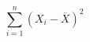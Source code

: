 \documentclass{article}
\begin{document}
\color{fgC}



\pagecolor{bgC}

\begin{displaymath}
\sum_{i=1}^{n} (X_i - \overline{X} )^2
\end{displaymath}
\end{document}
